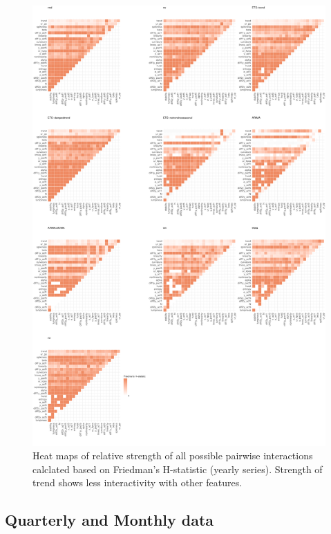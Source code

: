 \documentclass[11pt,a4paper,]{article}
\begin{document}
\begin{figure}
\centering
\includegraphics{figures/friedmany-1.pdf}
\caption{\label{fig:friedmany}Heat maps of relative strength of all possible
pairwise interactions calclated based on Friedman's H-statistic (yearly
series). Strength of trend shows less interactivity with other
features.}
\end{figure}

\newpage

\subsection{Quarterly and Monthly
data}\label{quarterly-and-monthly-data}
\end{document}

